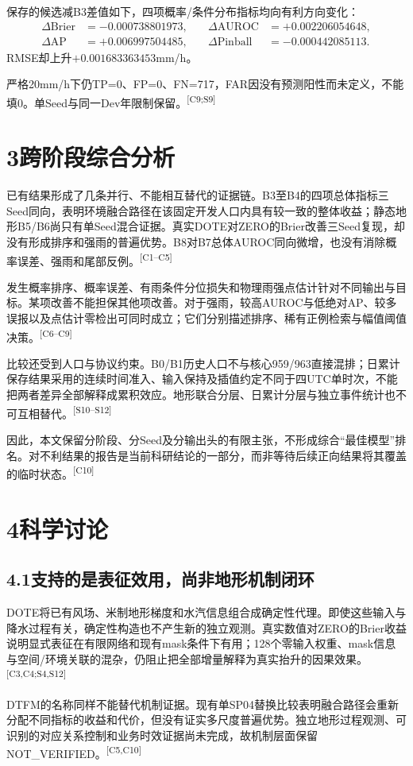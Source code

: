\documentclass[UTF8,10.5pt,a4paper,fontset=none]{ctexart}
\newcommand{\evi}[1]{\textsuperscript{\textcolor{muted}{[#1]}}}
\newcommand{\nextpart}[1]{\clearpage\section*{#1}}
\begin{document}
保存的候选减B3差值如下，四项概率/条件分布指标均向有利方向变化：
\[
\begin{aligned}
\Delta\mathrm{Brier}&=-0.000738801973,&\quad\Delta\mathrm{AUROC}&=+0.002206054648,\\
\Delta\mathrm{AP}&=+0.006997504485,&\quad\Delta\mathrm{Pinball}&=-0.000442085113.
\end{aligned}
\]
RMSE却上升$+0.001683363453$mm/h。

严格20mm/h下仍TP=0、FP=0、FN=717，FAR因没有预测阳性而未定义，不能填0。单Seed与同一Dev年限制保留。\evi{C9;S9}

\section*{3\quad 跨阶段综合分析}
已有结果形成了几条并行、不能相互替代的证据链。B3至B4的四项总体指标三Seed同向，表明环境融合路径在该固定开发人口内具有较一致的整体收益；静态地形B5/B6尚只有单Seed混合证据。真实DOTE对ZERO的Brier改善三Seed复现，却没有形成排序和强雨的普遍优势。B8对B7总体AUROC同向微增，也没有消除概率误差、强雨和尾部反例。\evi{C1--C5}

发生概率排序、概率误差、有雨条件分位损失和物理雨强点估计针对不同输出与目标。某项改善不能担保其他项改善。对于强雨，较高AUROC与低绝对AP、较多误报以及点估计零检出可同时成立；它们分别描述排序、稀有正例检索与幅值阈值决策。\evi{C6--C9}

比较还受到人口与协议约束。B0/B1历史人口不与核心959/963直接混排；日累计保存结果采用的连续时间准入、输入保持及插值约定不同于四UTC单时次，不能把两者差异全部解释成累积效应。地形联合分层、日累计分层与独立事件统计也不可互相替代。\evi{S10--S12}

因此，本文保留分阶段、分Seed及分输出头的有限主张，不形成综合“最佳模型”排名。对不利结果的报告是当前科研结论的一部分，而非等待后续正向结果将其覆盖的临时状态。\evi{C10}

\nextpart{4\quad 科学讨论}
\subsection*{4.1\quad 支持的是表征效用，尚非地形机制闭环}
DOTE将已有风场、米制地形梯度和水汽信息组合成确定性代理。即使这些输入与降水过程有关，确定性构造也不产生新的独立观测。真实数值对ZERO的Brier收益说明显式表征在有限网络和现有mask条件下有用；128个零输入权重、mask信息与空间/环境关联的混杂，仍阻止把全部增量解释为真实抬升的因果效果。\evi{C3,C4;S4,S12}

DTFM的名称同样不能替代机制证据。现有单SP04替换比较表明融合路径会重新分配不同指标的收益和代价，但没有证实多尺度普遍优势。独立地形过程观测、可识别的对应关系控制和业务时效证据尚未完成，故机制层面保留NOT\_VERIFIED。\evi{C5,C10}
\end{document}
